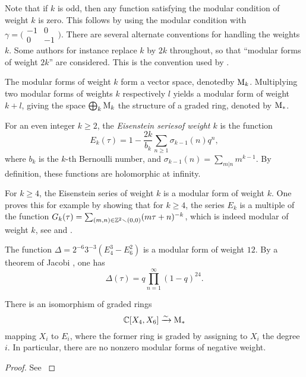 Note that if $k$ is odd, then any function satisfying the modular condition of weight $k$ is zero. This follows by using the modular condition with $\gamma = 
\bigl(\begin{smallmatrix}
 -1 & 0 \\
 0 & -1
\end{smallmatrix}\bigr).$
There are several alternate conventions for handling the weights $k$. Some authors for instance replace $k$ by $2k$ throughout, so that ``modular forms of weight $2k$'' are considered. This is the convention used by \cite{Serre1973}.

The modular forms of weight $k$ form a vector space, denoted\footnotemark by $\mathrm{M}_k$. Multiplying two modular forms of weights $k$ respectively $l$ yields a modular form of weight $k+l$, giving the space $\bigoplus_k \mathrm{M}_k$ the structure of a graded ring, denoted by $\mathrm{M}_{*}$.


\begin{expls} \label{ex:delta}
 For an even integer $k\geq 2$, the \emph{Eisenstein series\footnotemark of weight $k$} is the function \[E_k(\tau)=1-\frac{2k}{b_k}\sum_{n\geq 1}\sigma_{k-1}(n)q^n,\] where $b_k$ is the $k$-th Bernoulli number, and $\sigma_{k-1}(n)=\sum_{m|n}m^{k-1}$. By definition, these functions are holomorphic at infinity.
 
 For $k\geq 4$, the Eisenstein series of weight $k$ is a modular form of weight $k$. One proves this for example by showing that for $k\geq 4$, the series $E_k$ is a multiple of the function $G_k(\tau)=\sum_{(m,n)\in\mathbb{Z}^2\smallsetminus(0,0)}(m\tau+n)^{-k}$, which is indeed modular of weight $k$, see \cite[Ch.~VII, Prop.~8]{Serre1973} and \cite[Ch.~VII, 2.3]{Serre1973}.
 
 The function $\Delta=2^{-6}3^{-3}(E_4^3-E_6^2)$ is a modular form of weight $12$. By a theorem of Jacobi \cite[Ch.~VII, Thm.~6]{Serre1973}, one has \[\Delta(\tau)=q\prod_{n=1}^{\infty}(1-q)^{24}.\]
\end{expls}


\begin{prop}
 There is an isomorphism of graded rings \[\mathbb{C}[X_4, X_6]\xrightarrow{\sim} \mathrm{M}_*\] mapping $X_i$ to $E_i$, where the former ring is graded by assigning to $X_i$ the degree $i$. In particular, there are no nonzero modular forms of negative weight.
\end{prop}
\begin{proof}
 See \cite[Ch.~VII, 3.1, 3.2]{Serre1973}
\end{proof}


